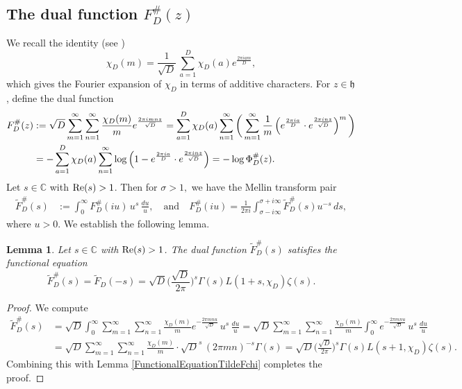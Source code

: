 \documentclass[11pt]{amsart}
\numberwithin{equation}{section}
\newtheorem{lem}[thm]{Lemma}
\theoremstyle{remark}
\begin{document}
\subsection{The dual function $F_{D}^\#(z)$}  
We recall the identity (see \cite[Ch. 3]{IK2004})
\[
{\chi_{D}}(m) = \frac{1}{\sqrt{D}} \, \sum\limits_{a=1}^D {\chi_{D}}(a) e^{\frac{2\pi i am}{D}},
\]
which gives the Fourier expansion of ${\chi_{D}}$ in terms of additive characters. For $z \in \mathfrak{h}$, define the dual function
  \begin{align}
  F_{D}^\#(z) & := \sqrt{D}\sum_{m=1}^\infty\sum_{n=1}^\infty \frac{{\chi_{D}}(m)}{m} e^{\frac{2\pi i m n z}{\sqrt{D}}} = \sum_{a=1}^D {\chi_{D}}(a)\sum_{n=1}^\infty \bigg( \sum_{m=1}^{\infty} \frac{1}{m}\left(e^{\frac{2\pi ia}{D}}\cdot e^{\frac{2\pi i  n z}{\sqrt{D}}}  \right)^m \bigg) \notag \\
  & = -  \sum_{a=1}^D {\chi_{D}}(a)\sum_{n=1}^\infty \log\left(1-  e^{\frac{2\pi ia}{D}}\cdot e^{\frac{2\pi i  n z}{\sqrt{D}}} \right)=  - \log \Phi_{D}^\#(z). \label{FchiSharp}
  \end{align}
Let $s\in\mathbb C$ with ${\rm Re}(s)>1$. Then for $\sigma>1,$
we have the Mellin transform pair
\begin{align*}
\widetilde {F}^\#_{D}(s) &:= \int_0^\infty F^\#_{D}(iu)\, u^s\,\frac{du}{u}, \quad \textrm{and} \quad F^\#_{D}(iu)= \frac{1}{2\pi i} \int_{\sigma-i\infty}^{\sigma+i\infty} \widetilde {F}^\#_{D}(s)u^{-s} \, ds,
\end{align*}
where $u>0$. We establish the following lemma.  
 \begin{lem} \label{TildeFchiSharp}
  Let $s\in\mathbb C$ with ${\rm Re}(s)>1$. The dual function  $\widetilde {F}^\#_{D}(s)$ satisfies the functional equation 
 \[
 \widetilde{F}^\#_{D}(s) = \widetilde{F}_{D}(-s)= \sqrt{D} \bigg(\frac{\sqrt{D}}{2\pi}\bigg)^{s} \Gamma(s) L(1+s,{\chi_{D}}) \zeta(s).
 \]
 \end{lem}
\begin{proof} We compute
\begin{align*}
 \widetilde {F}^\#_{D}(s) & = \sqrt{D}\int_0^\infty  \sum_{m=1}^\infty \sum_{n=1}^\infty \frac{{\chi_{D}}(m)}{m} e^{-\frac{2\pi  mnu}{\sqrt{D}}} \, u^s \,\frac{du}{u} = \sqrt{D} \sum_{m=1}^\infty \sum_{n=1}^\infty  \frac{{\chi_{D}}(m)}{m} \int_0^\infty   e^{-\frac{2\pi  mnu}{\sqrt{D}}} \, u^s \,\frac{du}{u}\\
  & = \sqrt{D} \sum_{m=1}^\infty \sum_{n=1}^\infty  \frac{{\chi_{D}}(m)}{m}\cdot \sqrt{D}^s\, (2\pi m n)^{-s} \Gamma(s) = \sqrt{D} \bigg(\frac{\sqrt{D}}{2\pi}\bigg)^{s} \Gamma(s) L(s+1,{\chi_{D}}) \zeta(s).
  \end{align*}
Combining this with Lemma \ref{FunctionalEquationTildeFchi} completes the proof.
  \end{proof}
 
\end{document}
